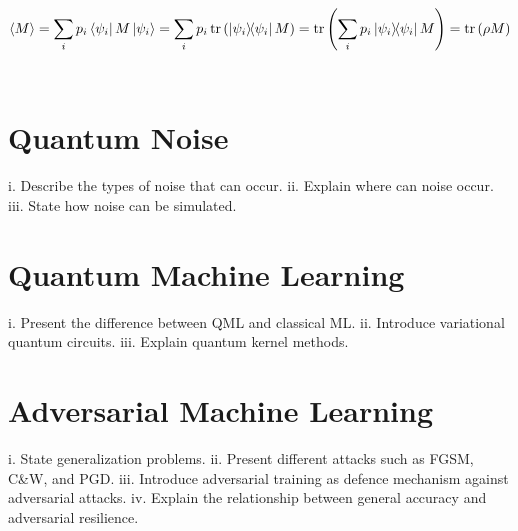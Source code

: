 \begin{equation}\label{eq:density_expectation}
  \ev{M} = \sum_{i}p_i\bra{\psi_i}M\ket{\psi_i} =
  \sum_{i}p_i\trace\left(\ketbra{\psi_i}{\psi_i}M\right) =
  \trace\left(\sum_{i}p_i\ketbra{\psi_i}{\psi_i}M\right) =
  \trace\left(\rho M\right)
\end{equation} \




\section{Quantum Noise}\label{section:noise}
i.	Describe the types of noise that can occur.
ii.	Explain where can noise occur.
iii.	State how noise can be simulated.

\section{Quantum Machine Learning}
i.	Present the difference between QML and classical ML\@.
ii.	Introduce variational quantum circuits.
iii.	Explain quantum kernel methods.

\section{Adversarial Machine Learning}
i.	State generalization problems.
ii.	Present different attacks such as FGSM, C\&W, and PGD\@.
iii.	Introduce adversarial training as defence mechanism against adversarial attacks.
iv.	Explain the relationship between general accuracy and adversarial resilience.